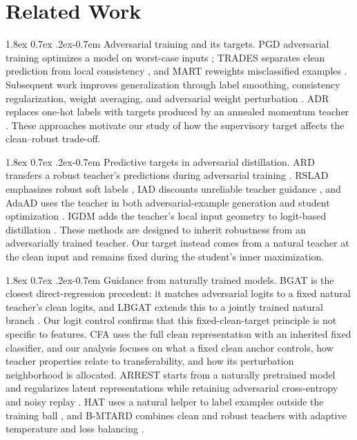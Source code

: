 \documentclass{article} %
\makeatletter
\theoremstyle{plain}
\renewcommand{\paragraph}{\@startsection{paragraph}{4}{\z@}%
  {1.8ex \@plus 0.7ex \@minus .2ex}{-0.7em}%
  {\normalfont\normalsize\bfseries}}
\makeatother
\begin{document}
\section{Related Work}
\label{sec:related}

\paragraph{Adversarial training and its targets.}
PGD adversarial training optimizes a model on worst-case inputs \citep{PGD}; TRADES separates clean
prediction from local consistency \citep{TRADES}, and MART reweights misclassified examples
\citep{MART}. Subsequent work improves generalization through label smoothing, consistency
regularization, weight averaging, and adversarial weight perturbation
\citep{pang2020bag,tack2022consistency,robustoverfit,2020_awp}. ADR replaces one-hot labels with
targets produced by an annealed momentum teacher \citep{adr}. These approaches motivate our study
of how the supervisory target affects the clean--robust trade-off.

\paragraph{Predictive targets in adversarial distillation.}
ARD transfers a robust teacher's predictions during adversarial training \citep{ard}. RSLAD emphasizes
robust soft labels \citep{rslad}, IAD discounts unreliable teacher guidance \citep{iad}, and AdaAD uses
the teacher in both adversarial-example generation and student optimization \citep{adaad}. IGDM adds
the teacher's local input geometry to logit-based distillation \citep{igdm}. These methods are designed
to inherit robustness from an adversarially trained teacher. Our target instead comes from a natural
teacher at the clean input and remains fixed during the student's inner maximization.

\paragraph{Guidance from naturally trained models.}
BGAT is the closest direct-regression precedent: it matches adversarial logits to a fixed natural
teacher's clean logits, and LBGAT extends this to a jointly trained natural branch \citep{lbgat}.
Our logit control confirms that this fixed-clean-target principle is not specific to features. CFA
uses the full clean representation with an inherited fixed classifier, and our analysis focuses on
what a fixed clean anchor controls, how teacher properties relate to transferability, and how its
perturbation neighborhood is allocated. ARREST starts
from a naturally pretrained model and regularizes latent representations while retaining adversarial
cross-entropy and noisy replay \citep{arrest}. HAT uses a natural helper to label examples outside the
training ball \citep{hat}, and B-MTARD combines clean and robust teachers with adaptive temperature
and loss balancing \citep{bmtard}.
\end{document}
